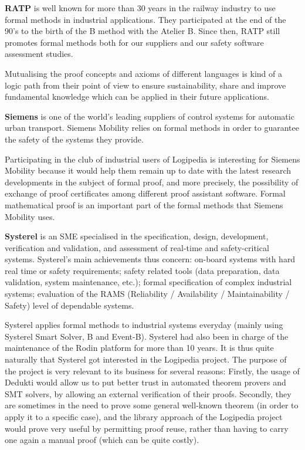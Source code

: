 {{\bf RATP} is well known for more than 30 years in the railway
industry to use formal methods in industrial applications. They
participated at the end of the 90's to the birth of the B method with
the Atelier B. Since then, RATP still promotes formal methods both for
our suppliers and our safety software assessment studies.

Mutualising the proof concepts and axioms of different languages is
kind of a logic path from their point of view to ensure
sustainability, share and improve fundamental knowledge which can be
applied in their future applications.

{\bf Siemens} is one of the world's leading suppliers of control
systems for automatic urban transport. Siemens Mobility relies on
formal methods in order to guarantee the safety of the systems they
provide.

Participating in the club of industrial users of Logipedia is
interesting for Siemens Mobility because it would help them remain up
to date with the latest research developments in the subject of formal
proof, and more precisely, the possibility of exchange of proof
certificates among different proof assistant software. Formal
mathematical proof is an important part of the formal methods that
Siemens Mobility uses.

{\bf Systerel} is an SME specialised in the specification, design,
development, verification and validation, and assessment of real-time
and safety-critical systems. Systerel's main achievements thus
concern: on-board systems with hard real time or safety requirements;
safety related tools (data preparation, data validation, system
maintenance, etc.); formal specification of complex industrial
systems; evaluation of the RAMS (Reliability / Availability /
Maintainability / Safety) level of dependable systems.

Systerel applies formal methods to industrial systems everyday (mainly
using Systerel Smart Solver, B and Event-B). Systerel had also been in
charge of the maintenance of the Rodin platform for more than 10
years. It is thus quite naturally that Systerel got interested in the
Logipedia project. The purpose of the project is very relevant to its
business for several reasons: Firstly, the usage of Dedukti would
allow us to put better trust in automated theorem provers and SMT
solvers, by allowing an external verification of their
proofs. Secondly, they are sometimes in the need to prove some general
well-known theorem (in order to apply it to a specific case), and the
library approach of the Logipedia project would prove very useful by
permitting proof reuse, rather than having to carry one again a manual
proof (which can be quite costly).

}
